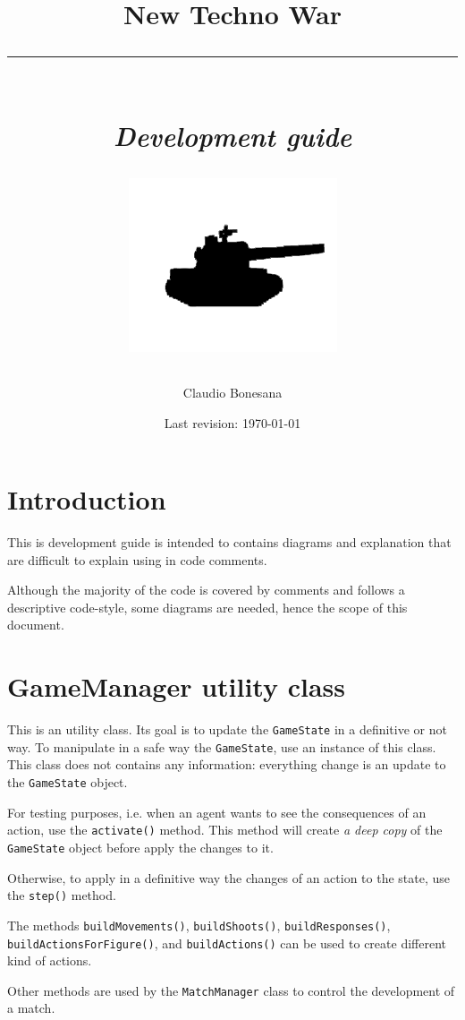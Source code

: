 \documentclass[a4paper]{report}
\author{Claudio Bonesana}
\title{
    \Large New Techno War \\
	\rule{10cm}{0.3mm} \\
	\large \textit{Development guide} \\
	\begin{center}
		\includegraphics[scale=0.8]{tank.png}
    \end{center}
}
\date{Last revision: \today}
\begin{document}
	
	\maketitle
	
	\tableofcontents
	
	
	\chapter{Introduction}

	This is development guide is intended to contains diagrams and explanation that are difficult to explain using in code comments.
	
	Although the majority of the code is covered by comments and follows a descriptive code-style, some diagrams are needed, hence the scope of this document.
	

	\chapter{GameManager utility class}

	This is an utility class. Its goal is to update the \texttt{GameState} in a definitive or not way. To manipulate in a safe way the \texttt{GameState}, use an instance of this class. This class does not contains any information: everything change is an update to the \texttt{GameState} object.

	For testing purposes, i.e. when an agent wants to see the consequences of an action, use the \texttt{activate()} method. This method will create \textit{a deep copy} of the \texttt{GameState} object before apply the changes to it.

	Otherwise, to apply in a definitive way the changes of an action to the state, use the \texttt{step()} method.

	The methods \texttt{buildMovements()}, \texttt{buildShoots()}, \texttt{buildResponses()}, \texttt{build\-ActionsForFigure()}, and \texttt{buildActions()} can be used to create different kind of actions.

	Other methods are used by the \texttt{MatchManager} class to control the development of a match.

\end{document}
